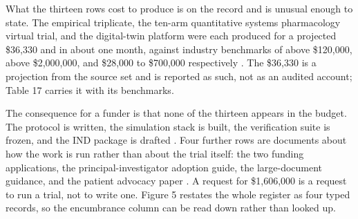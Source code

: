 What the thirteen rows cost to produce is on the record and is unusual enough to
state. The empirical triplicate, the ten-arm quantitative systems pharmacology
virtual trial, and the digital-twin platform were each produced for a projected
\$36,330 and in about one month, against industry benchmarks of above \$120,000,
above \$2,000,000, and \$28,000 to \$700,000 respectively \cite{qspmetpancre}.
The \$36,330 is a projection from the source set and is reported as such, not as
an audited account; Table 17 carries it with its benchmarks.

The consequence for a funder is that none of the thirteen appears in the budget.
The protocol is written, the simulation stack is built, the verification suite
is frozen, and the IND package is drafted \cite{foundingdocs,onpremwhippl,%
phase2proto,phase1ind}. Four further rows are documents about how the work is
run rather than about the trial itself: the two funding applications, the
principal-investigator adoption guide, the large-document guidance, and the
patient advocacy paper \cite{fundapp1,fundapp2,piadoption,phase1guidance,%
patientadvocacy}. A request for \$1,606,000 is a request to run a trial, not to
write one. Figure 5 restates the whole register as four typed records, so the
encumbrance column can be read down rather than looked up.

